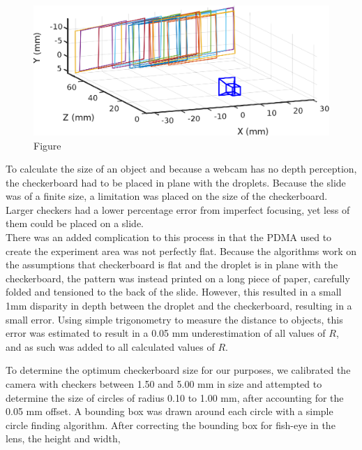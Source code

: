 \documentclass{physics_article_B}
\begin{document}
                \begin{figure}[H]
                    \centering       \includegraphics{Figures/CameraExtrinsics.eps}
                    \caption{Figure }\label{fig:calib}
                \end{figure}
        
            To calculate the size of an object and because a webcam has no depth perception, the checkerboard had to be placed in plane with the droplets. Because the slide was of a finite size, a limitation was placed on the size of the checkerboard. Larger checkers had a lower percentage error from imperfect focusing, yet less of them could be placed on a slide. \\
            
            There was an added complication to this process in that the PDMA used to create the experiment area was not perfectly flat. Because the algorithms work on the assumptions that checkerboard is flat and the droplet is in plane with the checkerboard, the pattern was instead printed on a long piece of paper, carefully folded and tensioned to the back of the slide. However, this resulted in a small 1mm disparity in depth between the droplet and the checkerboard, resulting in a small error. Using simple trigonometry to measure the distance to objects, this error was estimated to result in a 0.05 mm underestimation of all values of $R$, and as such was added to all calculated values of $R$.   
            
            To determine the optimum checkerboard size for our purposes, we calibrated the camera with checkers between 1.50 and 5.00 mm in size and attempted to determine the size of circles of radius 0.10 to 1.00 mm, after accounting for the 0.05 mm offset. A bounding box was drawn around each circle with a simple circle finding algorithm. After correcting the bounding box for fish-eye in the lens, the height and width, 
\end{document}
